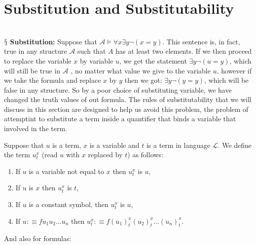\documentclass[9pt,a4paper, twocolumn]{article}
\newcommand{\newpoint}[1]{\ \\ \indent$\mathsection$ \textbf{#1}}
\newcommand{\curveL}{\mathcal{L}}
\newcommand{\curveA}{\mathcal{A}}
\begin{document}
    \section*{Substitution and Substitutability}
        \newpoint{Substitution:}
            Suppose that $\curveA\vDash \forall x\exists y\neg(x=y)$. This sentence is, in fact, true in any structure $\curveA$ such that $A$ has at least two elements. If we then proceed to replace the variable $x$ by variable $u$, we get the statement $\exists y\neg(u=y)$, which will still be true in $\curveA$ , no matter what value we give to the variable $u$. however if we take the formula and replace $x$ by $y$ then we got: $\exists y\neg(y=y)$, which will be false in any structure. So by a poor choice of substituting variable, we have changed the truth values of out formula. The rules of substitutability that we will discuss in this section are designed to help us avoid this problem, the problem of attemptint to substitute a term inside a quantifier that binds a variable that involved in the term.
            \begin{define} 
                Suppose that $u$ is a term, $x$ is a variable and $t$ is a term in language $\curveL$. We define the term $u^x_t$ (read $u$ with $x$ replaced by $t$) as follows:
                \begin{enumerate}
                    \item If $u$ is a variable not equal to $x$ then $u^x_t$ is $u$,
                    \item If $u$ is $x$ then $u^x_t$ is $t$,
                    \item If $u$ is a constant symbol, then $u^x_t$ is $u$,
                    \item If $u:\equiv fu_1u_2\dots u_n$ then  $u^x_t :\equiv f(u_1)^x_t(u_2)^x_t\dots(u_n)^x_t$.
                \end{enumerate}
            \end{define}
            And also for formulas:
\end{document}
